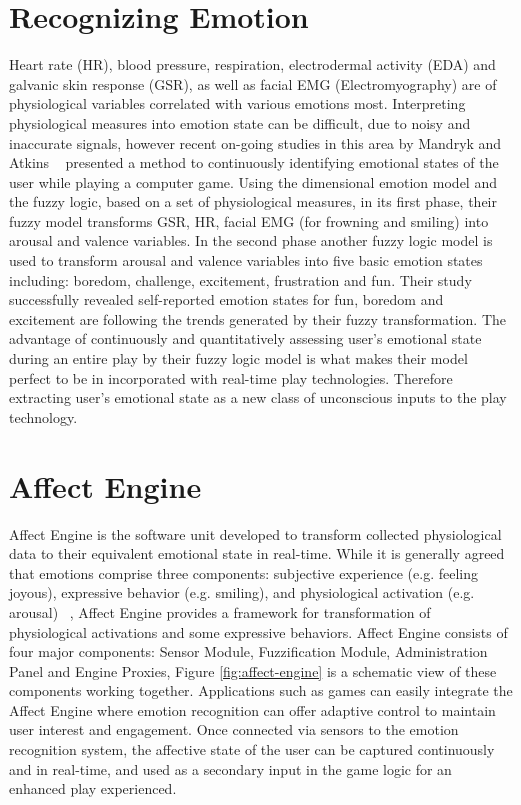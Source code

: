 \documentclass{uofsthesis-cs}
\begin{document}
\section{Recognizing Emotion} %
Heart rate (HR), blood pressure, respiration, electrodermal activity (EDA) and galvanic skin response (GSR), as well as facial EMG (Electromyography) are of physiological variables correlated with various emotions most. Interpreting physiological measures into emotion state can be difficult, due to noisy and inaccurate signals, however recent on-going studies in this area by Mandryk and Atkins ~\cite{mandryk2007fuzzy} presented a method to continuously identifying emotional states of the user while playing a computer game. Using the dimensional emotion model and the fuzzy logic, based on a set of physiological measures, in its first phase, their fuzzy model transforms GSR, HR, facial EMG (for frowning and smiling) into arousal and valence variables. In the second phase another fuzzy logic model is used to transform arousal and valence variables into five basic emotion states including: boredom, challenge, excitement, frustration and fun. Their study successfully revealed self-reported emotion states for fun, boredom and excitement are following the trends generated by their fuzzy transformation. The advantage of continuously and quantitatively assessing user's emotional state during an entire play by their fuzzy logic model is what makes their model perfect to be in incorporated with real-time play technologies. Therefore extracting user's emotional state as a new class of unconscious inputs to the play technology.


\section{Affect Engine} %
Affect Engine is the software unit developed to transform collected physiological data to their equivalent emotional state in real-time. While it is generally agreed that emotions comprise three components: subjective experience (e.g. feeling joyous), expressive behavior (e.g. smiling), and physiological activation (e.g. arousal) ~\cite{scherer1993neuroscience}, Affect Engine provides a framework for transformation of physiological activations and some expressive behaviors. Affect Engine consists of four major components: Sensor Module, Fuzzification Module, Administration Panel and Engine Proxies, Figure \ref{fig:affect-engine} is a schematic view of these components working together. Applications such as games can easily integrate the Affect Engine where emotion recognition can offer adaptive control to maintain user interest and engagement. Once connected via sensors to the emotion recognition system, the affective state of the user can be captured continuously and in real-time, and used as a secondary input in the game logic for an enhanced play experienced.
\end{document}

